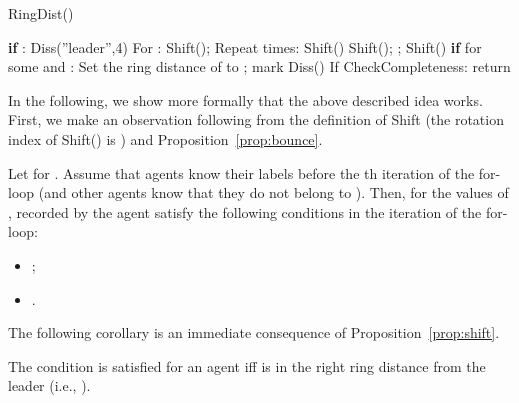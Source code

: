 \begin{algorithm}[]
	\caption{RingDist()}
	\label{alg:move:perceptive}
	\begin{algorithmic}[1]
\State \textbf{if} : Diss(''leader'',4)\iffull{}\else{}\fi
    \For{}
        \State 
        \State For : Shift(); 
        \State Repeat  times: Shift() \iffull{}\else{}\fi
        \State Shift(); ; Shift()
        \State \textbf{if}  for some 
				and : 
				\State\phantom{abc}Set the ring distance of  to ; mark \iffull{}\else{}\fi
					\State Diss()
					\iffull{}\else{}\fi
				\EndIf
\State If CheckCompleteness: return\iffull{}\fi
    \EndFor
\end{algorithmic}
\end{algorithm}
In the following, we show more formally that the above described idea works. First, we make
an observation following from the definition of Shift (the rotation index of Shift() is )
and Proposition~\ref{prop:bounce}.
\begin{proposition}\label{prop:shift}
Let  for .
Assume that agents  know their labels before the th
iteration of the for-loop (and other agents know that they do not belong
to ).
Then, for  the values of ,  recorded by the agent  satisfy the following
conditions in the iteration  of the for-loop:
\begin{itemize}
\item ;
\item .
\end{itemize}
\end{proposition}


\iffull
The following corollary is an immediate consequence of Proposition~\ref{prop:shift}.
\fi
\begin{corollary}
The condition  is satisfied for an agent  iff  is in the right ring distance
 from the leader (i.e., ).
\end{corollary}

